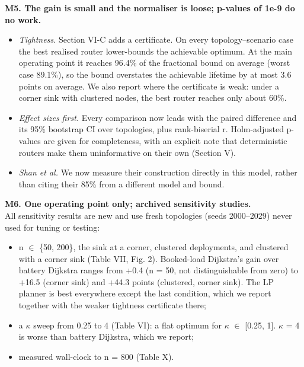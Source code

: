 \documentclass[11pt]{article}
\begin{document}
\medskip\noindent \textbf{M5. The gain is small and the normaliser is loose; p-values of 1e-9 do no work.}\\

\begin{itemize}[leftmargin=*,itemsep=2pt]
\item \emph{Tightness.} Section VI-C adds a certificate. On every topology--scenario case the best realised router lower-bounds the achievable optimum. At the main operating point it reaches 96.4\% of the fractional bound on average (worst case 89.1\%), so the bound overstates the achievable lifetime by at most 3.6 points on average. We also report where the certificate is weak: under a corner sink with clustered nodes, the best router reaches only about 60\%.
\item \emph{Effect sizes first.} Every comparison now leads with the paired difference and its 95\% bootstrap CI over topologies, plus rank-biserial r. Holm-adjusted p-values are given for completeness, with an explicit note that deterministic routers make them uninformative on their own (Section V).
\item \emph{Shan et al.} We now measure their construction directly in this model, rather than citing their 85\% from a different model and bound.
\end{itemize}

\medskip\noindent \textbf{M6. One operating point only; archived sensitivity studies.}\\
All sensitivity results are new and use fresh topologies (seeds 2000--2029) never used for tuning or testing:

\begin{itemize}[leftmargin=*,itemsep=2pt]
\item n $\in$ \{50, 200\}, the sink at a corner, clustered deployments, and clustered with a corner sink (Table VII, Fig. 2). Booked-load Dijkstra's gain over battery Dijkstra ranges from +0.4 (n = 50, not distinguishable from zero) to +16.5 (corner sink) and +44.3 points (clustered, corner sink). The LP planner is best everywhere except the last condition, which we report together with the weaker tightness certificate there;
\item a $\kappa$ sweep from 0.25 to 4 (Table VI): a flat optimum for $\kappa$ $\in$ [0.25, 1]. $\kappa$ = 4 is worse than battery Dijkstra, which we report;
\item measured wall-clock to n = 800 (Table X).
\end{itemize}
\end{document}
